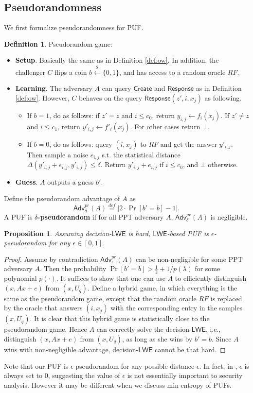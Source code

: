 \documentclass[12pt]{article}
\newcommand{\eqdef}{\stackrel{def}{=}}
\newcommand{\bits}{\{0,1\}}
\newcommand{\getsr}{\stackrel{\$}{\gets}}
\newcommand{\Adv}{\mathsf{Adv}}
\newcommand{\LWE}{\mathsf{LWE}}
\newcommand{\Create}{\mathsf{Create}}
\newcommand{\Response}{\mathsf{Response}}
\newtheorem{proposition}[theorem]{Proposition}
\theoremstyle{definition}
\newtheorem{definition}[theorem]{Definition}
\begin{document}
\subsection{Pseudorandomness}
We first formalize pseudorandomness for PUF.
\begin{definition}
Pseudorandom game:
\begin{itemize}
\item {\bf Setup}. Basically the same as in Definition \ref{def:ow}. In addition, the challenger $C$ flips a coin $b \getsr \bits$, and has access to a random oracle $RF$.
\item {\bf Learning}. The adversary $A$ can query $\Create$ and $\Response$ as in Definition \ref{def:ow}. However, $C$ behaves on the query $\Response(z', i, x_j)$ as following.
	\begin{itemize}
	\item If $b=1$, do as follows: if $z'=z$ and $i \leq c_0$, return $y_{i,j} \gets f_i(x_j)$. If $z'\not= z$ and $i \leq c_1$, return $y'_{i,j} \gets f'_i(x_j)$. For other cases return $\bot$.
	\item If $b=0$, do as follows: query $(i, x_j)$ to $RF$ and get the answer $y'_{i,j}$. Then sample a noise $e_{i,j}$ s.t. the statistical distance $\Delta(y'_{i,j} + e_{i,j}, y'_{i,j}) \leq \delta$. Return $y'_{i,j} + e_{i,j}$ if $i\leq c_0$, and $\bot$ otherwise.
	\end{itemize}
\item {\bf Guess}. $A$ outputs a guess $b'$.
\end{itemize}
Define the pseudorandom advantage of $A$ as
$$\Adv_{\delta}^{pr}(A) \eqdef |2\cdot \Pr[b'=b] - 1|.$$
A PUF is {\bf $\delta$-pseudorandom} if for all PPT adversary $A$, $\Adv_{\delta}^{pr}(A)$ is negligible.
\end{definition}

\begin{proposition}
Assuming decision-$\LWE$ is hard, $\LWE$-based PUF is $\epsilon$-pseudorandom for any $\epsilon \in [0,1]$.
\end{proposition}
\begin{proof}
Assume by contradiction $\Adv_{\epsilon}^{pr}(A)$ can be non-negligible for some PPT adversary $A$. Then the probability $\Pr[b'=b] > \frac{1}{2} + 1/p(\lambda)$ for some polynomial $p(\cdot)$. It suffices to show that one can use $A$ to efficiently distinguish $(x, Ax+e)$ from $(x, U_q)$. Define a hybrid game, in which everything is the same as the pseudorandom game, except that the random oracle $RF$ is replaced by the oracle that answers $(i, x_j)$ with the corresponding entry in the samples $(x, U_q)$. It is clear that this hybrid game is statistically close to the pseudorandom game. Hence $A$ can correctly solve the decision-$\LWE$, i.e., distinguish $(x, Ax+e)$ from $(x, U_q)$, as long as she wins by $b'=b$. Since $A$ wins with non-negligible advantage, decision-$\LWE$ cannot be that hard.
\end{proof}
Note that our PUF is $\epsilon$-pseudorandom for any possible distance $\epsilon$. In fact, in \cite{sadeghi2010puf}, $\epsilon$ is always set to 0, suggesting the value of $\epsilon$ is not essentially important to security analysis. However it may be different when we discuss min-entropy of PUFs.
\end{document}

